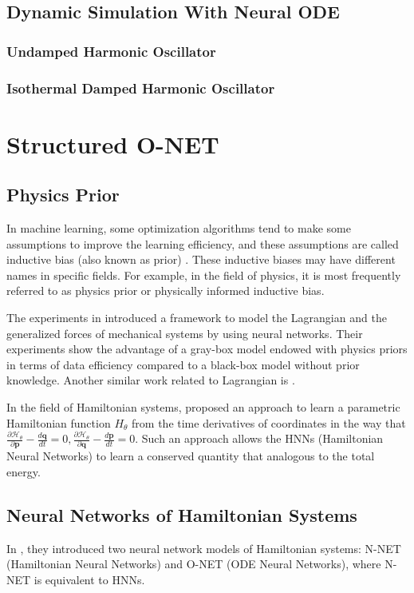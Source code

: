 \documentclass[
	parskip, 			   %
	twoside, 			   %
	DIV=14, 			   %
	BCOR=15.0mm, 		   %
	headsepline, 		   %
	open=right, 		   %
	captions=tableheading, %
	bibliography=totoc,    %
	numbers=noenddot       %
]{scrreprt}
\begin{document}
\section{Dynamic Simulation With Neural ODE}
\subsection{Undamped Harmonic Oscillator}
\subsection{Isothermal Damped Harmonic Oscillator}


\clearpage
\chapter{Structured O-NET}
\label{ch:chapter6}
\section{Physics Prior}
In machine learning, some optimization algorithms tend to make some assumptions to improve the learning efficiency, and these assumptions are called inductive bias (also known as prior) \cite{mitchell1997machine}. These inductive biases may have different names in specific fields. For example, in the field of physics, it is most frequently referred to as physics prior or physically informed inductive bias.

The experiments in \cite{gupta2019general} introduced a framework to model the Lagrangian and the generalized forces of mechanical systems by using neural networks. Their experiments show the advantage of a gray-box model endowed with physics priors in terms of data efficiency compared to a black-box model without prior knowledge. Another similar work related to Lagrangian is \cite{lutter2019deep}.

In the field of Hamiltonian systems, \cite{greydanus2019hamiltonian} proposed an approach to learn a parametric Hamiltonian function $H_{\theta}$ from the time derivatives of coordinates in the way that $\frac{\partial \mathcal{H}_{\theta}}{\partial \mathbf{p}} - \frac{d\mathbf{q}}{dt} = 0, \frac{\partial \mathcal{H}_{\theta}}{\partial \mathbf{q}} - \frac{d\mathbf{p}}{dt} = 0 $. Such an approach allows the HNNs (Hamiltonian Neural Networks) to learn a conserved quantity that analogous to the total energy.

\section{Neural Networks of Hamiltonian Systems}
In \cite{chen2019symplectic}, they introduced two neural network models of Hamiltonian systems: N-NET (Hamiltonian Neural Networks) and O-NET (ODE Neural Networks), where N-NET is equivalent to HNNs. 
\end{document}
